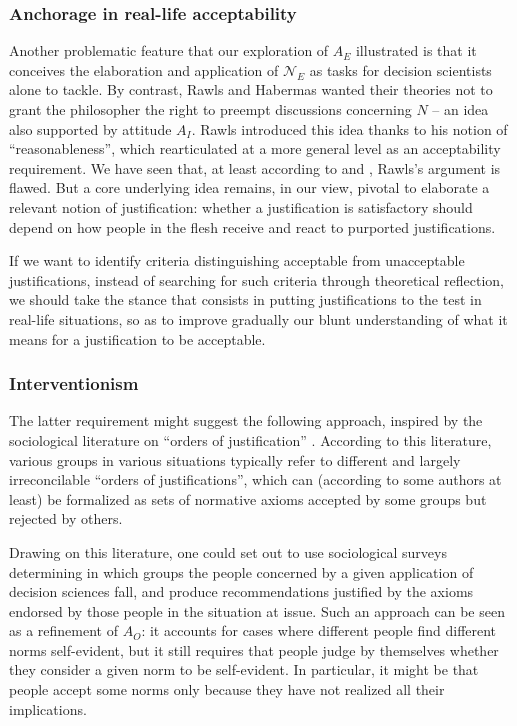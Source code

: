 \documentclass[preprint, french, english, 11pt, authoryear]{elsarticle}%
\begin{document}
\subsubsection{Anchorage in real-life acceptability}
Another problematic feature that our exploration of $A_E$ illustrated is that it conceives the elaboration and application of $\mathscr{N}_E$ as tasks for decision scientists alone to tackle. 
By contrast, Rawls and Habermas wanted their theories not to grant the philosopher the right to preempt discussions concerning $N$ -- an idea also supported by attitude $A_I$. 
Rawls introduced this idea thanks to his notion of ``reasonableness'', which \citeauthor{estlund_democratic_2009} rearticulated at a more general level as an acceptability requirement. 
We have seen that, at least according to \citeauthor{habermas_reconciliation_1995} and \citeauthor{estlund_democratic_2009}, Rawls's argument is flawed. 
But a core underlying idea remains, in our view, pivotal to elaborate a relevant notion of justification: whether a justification is satisfactory should depend on how people in the flesh receive and react to purported justifications.

If we want to identify criteria distinguishing acceptable from unacceptable justifications, instead of searching for such criteria through theoretical reflection, we should take the stance that consists in putting justifications to the test in real-life situations, 
so as to improve gradually our blunt understanding of what it means for a justification to be acceptable.


\subsubsection{Interventionism}
The latter requirement might suggest the following approach, inspired by the sociological literature on “orders of justification” \citep{boltanski_justification_2006}. 
According to this literature, various groups in various situations typically refer to different and largely irreconcilable “orders of justifications”, which can (according to some authors at least) be formalized as sets of normative axioms accepted by some groups but rejected by others.

Drawing on this literature, one could set out to use sociological surveys determining in which groups the people concerned by a given application of decision sciences fall, and produce recommendations justified by the axioms endorsed by those people in the situation at issue. 
Such an approach can be seen as a refinement of $A_O$: it accounts for cases where different people find different norms self-evident, but it still requires that people judge by themselves whether they consider a given norm to be self-evident. 
In particular, it might be that people accept some norms only because they have not realized all their implications.
\end{document}
